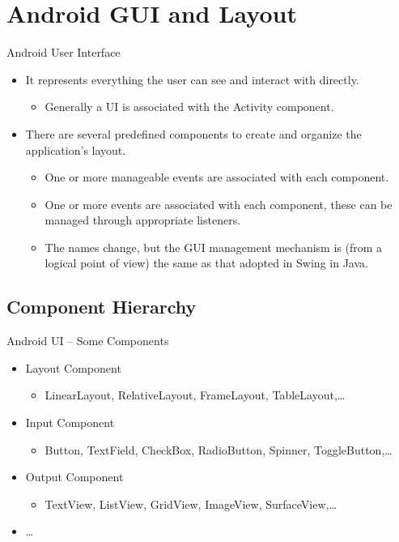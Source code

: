 \documentclass{beamer}
\begin{document}
\section{Android GUI and Layout}
  \begin{frame}{Android User Interface}
    \begin{itemize}\itemsep20pt
      \item It represents everything the user can see and interact with directly.
      \begin{itemize}
        \item Generally a UI is associated with the Activity component. 
      \end{itemize}
      \item There are several predefined components to create and organize the
      application's layout.  
      \begin{itemize}
        \item One or more manageable events are associated with each component.
        \item One or more events are associated with each component, these can
        be managed through appropriate listeners.
        \item The names change, but the GUI management mechanism is (from a
        logical point of view) the same as that adopted in Swing in Java. 
      \end{itemize}
    \end{itemize}
  \end{frame}

\subsection{Component Hierarchy}
  \begin{frame}{Android UI -- Some Components}
    \begin{itemize}\itemsep10pt
      \item Layout Component 
      \begin{itemize}
        \item LinearLayout, RelativeLayout, FrameLayout, TableLayout,\dots
      \end{itemize}
      \item Input Component
      \begin{itemize}
        \item Button, TextField, CheckBox, RadioButton, Spinner, ToggleButton,\dots
      \end{itemize}
      \item Output Component
      \begin{itemize}
        \item TextView, ListView, GridView, ImageView, SurfaceView,\dots
      \end{itemize}
      \item \dots
    \end{itemize}
    \vfill
  \end{frame}
\end{document}
